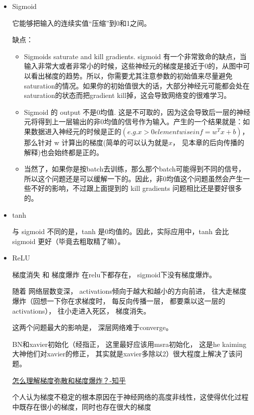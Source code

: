 \begin{itemize}
\item Sigmoid

它能够把输入的连续实值“压缩”到0和1之间。

缺点：
\begin{itemize}
\item Sigmoids saturate and kill gradients. sigmoid 有一个非常致命的缺点，当输入非常大或者非常小的时候，这些神经元的梯度是接近于0的，从图中可以看出梯度的趋势。所以，你需要尤其注意参数的初始值来尽量避免saturation的情况。如果你的初始值很大的话，大部分神经元可能都会处在saturation的状态而把gradient kill掉，这会导致网络变的很难学习。

\item Sigmoid 的 output 不是0均值. 这是不可取的，因为这会导致后一层的神经元将得到上一层输出的非0均值的信号作为输入。产生的一个结果就是：如果数据进入神经元的时候是正的$(e.g. x>0 elementwise in f=w^T x + b)$，那么针对 w 计算出的梯度(简单的可以认为就是$x$， 见本章的后向传播的解释)也会始终都是正的。


\item 当然了，如果你是按batch去训练，那么那个batch可能得到不同的信号，所以这个问题还是可以缓解一下的。因此，非0均值这个问题虽然会产生一些不好的影响，不过跟上面提到的 kill gradients 问题相比还是要好很多的。
\end{itemize}

\item tanh

与 sigmoid 不同的是，tanh 是0均值的。因此，实际应用中，tanh 会比 sigmoid 更好（毕竟去粗取精了嘛）。

\item ReLU

梯度消失 和 梯度爆炸 在relu下都存在， sigmoid下没有梯度爆炸。

随着 网络层数变深， activations倾向于越大和越小的方向前进， 往大走梯度爆炸（回想一下你在求梯度时， 每反向传播一层， 都要乘以这一层的activations）， 往小走进入死区， 梯度消失。

这两个问题最大的影响是， 深层网络难于converge。

BN和xavier初始化（经指正， 这里最好应该用msra初始化， 这是he kaiming大神他们对xavier的修正， 其实就是xavier多除以2）很大程度上解决了该问题。

\href{https://www.zhihu.com/question/66027838}{怎么理解梯度弥散和梯度爆炸？-知乎}

个人认为梯度不稳定的根本原因在于神经网络的高度非线性，这使得优化过程中既存在很小的梯度，同时也存在很大的梯度


\end{itemize}
